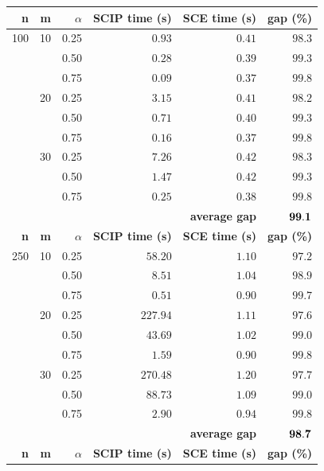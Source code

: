 \begin{table}
{
\renewcommand{\arraystretch}{1.5}%
\fontsize{8.5pt}{1em}\selectfont 
\begin{center}
\begin{tabular}[c]{|r|r|r|rrr|} \hline
\textbf{n}   & \textbf{m}  & \textbf{$\alpha$}    &\textbf{SCIP time (s)}& \textbf{SCE time (s)} & \textbf{gap (\%)} \\ \hline
100 & 10 & 0.25 & $  0.93$ & $  0.41$  & $98.3$ \\
    &    & 0.50 & $  0.28$ & $  0.39$  & $99.3$ \\
    &    & 0.75 & $  0.09$ & $  0.37$  & $99.8$ \\ \cline{2-6}
    & 20 & 0.25 & $  3.15$ & $  0.41$  & $98.2$ \\
    &    & 0.50 & $  0.71$ & $  0.40$  & $99.3$ \\
    &    & 0.75 & $  0.16$ & $  0.37$  & $99.8$ \\ \cline{2-6}
    & 30 & 0.25 & $  7.26$ & $  0.42$  & $98.3$ \\
    &    & 0.50 & $  1.47$ & $  0.42$  & $99.3$ \\
    &    & 0.75 & $  0.25$ & $  0.38$  & $99.8$ \\ \cline{2-6}
    & \multicolumn{4}{r}{\textbf{average gap}}  & $\bf 99.1$  \\ \hline \hline
\textbf{n}   & \textbf{m}  & \textbf{$\alpha$}    &\textbf{SCIP time (s)}& \textbf{SCE time (s)} & \textbf{gap (\%)} \\ \hline
250 & 10 & 0.25 & $ 58.20$ & $  1.10$  & $97.2$ \\
    &    & 0.50 & $  8.51$ & $  1.04$  & $98.9$ \\
    &    & 0.75 & $  0.51$ & $  0.90$  & $99.7$ \\ \cline{2-6}
    & 20 & 0.25 & $227.94$ & $  1.11$  & $97.6$ \\
    &    & 0.50 & $ 43.69$ & $  1.02$  & $99.0$ \\
    &    & 0.75 & $  1.59$ & $  0.90$  & $99.8$ \\ \cline{2-6}
    & 30 & 0.25 & $270.48$ & $  1.20$  & $97.7$ \\
    &    & 0.50 & $ 88.73$ & $  1.09$  & $99.0$ \\
    &    & 0.75 & $  2.90$ & $  0.94$  & $99.8$ \\ \cline{2-6}
    & \multicolumn{4}{r}{\textbf{average gap}}  & $\bf 98.7$  \\ \hline \hline
\textbf{n}   & \textbf{m}  & \textbf{$\alpha$}    &\textbf{SCIP time (s)}& \textbf{SCE time (s)} & \textbf{gap (\%)} \\ \hline

\end{tabular}
\end{center}}
\end{table}
